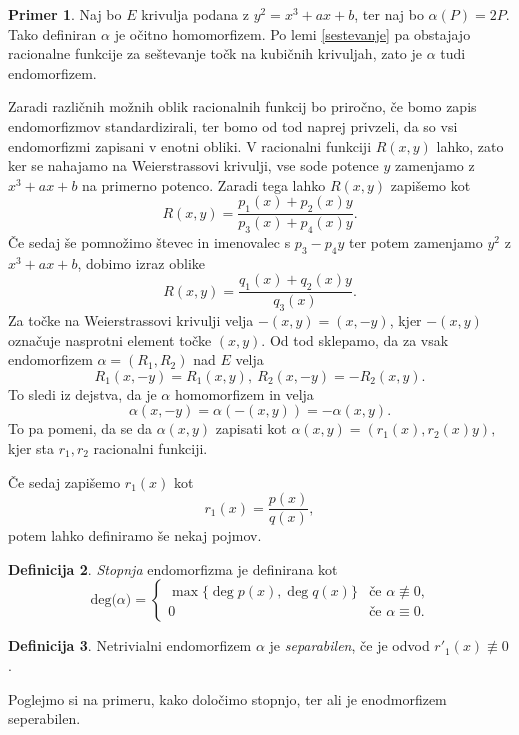 \documentclass[12pt,a4paper,twoside]{article}
\theoremstyle{definition} %
\newtheorem{definicija}{Definicija}[section]
\newtheorem{primer}[definicija]{Primer}
\theoremstyle{plain} %
\numberwithin{equation}{section}  %
\newcommand{\DEG}[1]{\ \text{deg(}{#1}\text{)}}
\begin{document}
\begin{primer}
Naj bo $E$ krivulja podana z $y^2 = x^3+ax+b$, ter naj bo $\alpha(P) = 2P$. Tako definiran $\alpha$ je očitno homomorfizem. Po lemi \ref{sestevanje} pa obstajajo racionalne funkcije za seštevanje točk na kubičnih krivuljah, zato je $\alpha$ tudi endomorfizem.
\end{primer}

Zaradi različnih možnih oblik racionalnih funkcij bo priročno, če bomo zapis endomorfizmov standardizirali, ter bomo od tod naprej privzeli, da so vsi endomorfizmi zapisani v enotni obliki.
V racionalni funkciji $R(x,y)$ lahko, zato ker se nahajamo na Weierstrassovi krivulji, vse sode potence $y$ zamenjamo z $x^3+ax+b$ na primerno potenco. Zaradi tega lahko $R(x,y)$ zapišemo kot
$$R(x,y) = \frac{p_1(x)+p_2(x)y}{p_3(x)+p_4(x)y}.$$
Če sedaj še pomnožimo števec in imenovalec s $p_3-p_4y$ ter potem zamenjamo $y^2$ z $x^3+ax+b$, dobimo izraz oblike
$$R(x,y) = \frac{q_1(x)+q_2(x)y}{q_3(x)}.$$
Za točke na Weierstrassovi krivulji velja $-(x,y) = (x,-y)$, kjer $-(x,y)$ označuje nasprotni element točke $(x,y)$. Od tod sklepamo, da za vsak endomorfizem $\alpha = (R_1,R_2) $ nad $E$ velja
$$R_1(x,-y) = R_1(x,y), \ R_2(x,-y) = -R_2(x,y).$$
To sledi iz dejstva, da je $\alpha$ homomorfizem in velja
$$\alpha(x,-y) = \alpha(-(x,y)) = -\alpha(x,y).$$
To pa pomeni, da se da $\alpha(x,y)$ zapisati kot
$\alpha(x,y) = (r_1(x),r_2(x)y),$
kjer sta $r_1,r_2$ racionalni funkciji.

Če sedaj zapišemo $r_1(x)$ kot
$$r_1(x) = \frac{p(x)}{q(x)},$$
potem lahko definiramo še nekaj pojmov. 

\begin{definicija}
\emph{Stopnja} endomorfizma je  definirana kot
$$
\DEG{\alpha} =
\begin{cases}
\max \{ \deg{p(x)},\deg{q(x)} \} & \text{če }\alpha \not\equiv 0, \\
0 & \text{če } \alpha \equiv 0.
\end{cases}
$$
\end{definicija}

\begin{definicija}
Netrivialni endomorfizem $\alpha$ je \emph{separabilen}, če je odvod $r'_1(x) \not \equiv 0$.
\end{definicija}

Poglejmo si na primeru, kako določimo stopnjo, ter ali je enodmorfizem seperabilen.
\end{document}
